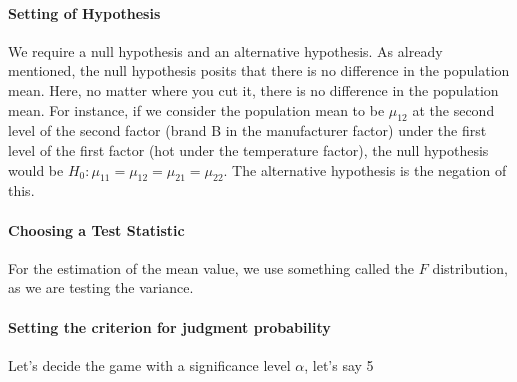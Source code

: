 \documentclass{ltjsarticle}
\begin{document}
\paragraph{Setting of Hypothesis} We require a null hypothesis and an alternative hypothesis. As already mentioned, the null hypothesis posits that there is no difference in the population mean. Here, no matter where you cut it, there is no difference in the population mean. For instance, if we consider the population mean to be $\mu_{12}$ at the second level of the second factor (brand B in the manufacturer factor) under the first level of the first factor (hot under the temperature factor), the null hypothesis would be $H_0:\mu_{11}=\mu_{12}=\mu_{21}=\mu_{22}$. The alternative hypothesis is the negation of this.
\paragraph{Choosing a Test Statistic} For the estimation of the mean value, we use something called the $F$ distribution, as we are testing the variance.
\paragraph{Setting the criterion for judgment probability} Let's decide the game with a significance level $\alpha$, let's say 5%
\end{document}
